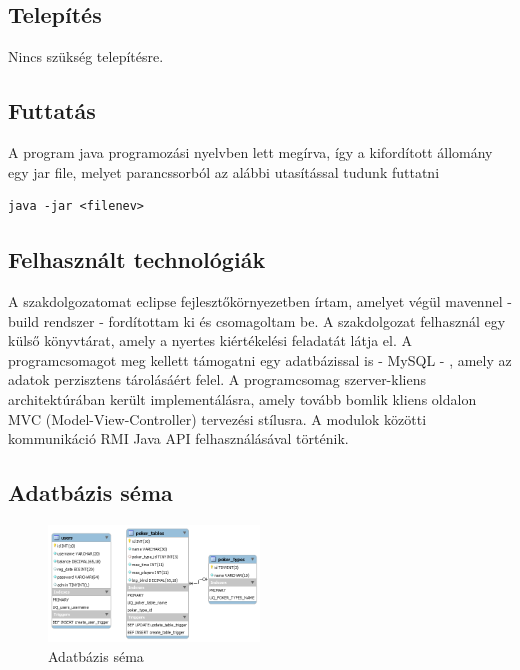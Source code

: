 \subsection{Telepítés}
Nincs szükség telepítésre.
\subsection{Futtatás}
A program java programozási nyelvben lett megírva, így a kifordított állomány egy jar file, melyet parancssorból az alábbi utasítással tudunk futtatni
\begin{lstlisting}
java -jar <filenev>
\end{lstlisting}
\subsection{Felhasznált technológiák}
A szakdolgozatomat eclipse fejlesztőkörnyezetben írtam, amelyet végül mavennel - build rendszer - fordítottam ki és csomagoltam be. A szakdolgozat felhasznál egy külső könyvtárat, amely a nyertes kiértékelési feladatát látja el. A programcsomagot meg kellett támogatni egy adatbázissal is - MySQL - , amely az adatok perzisztens tárolásáért felel. A programcsomag szerver-kliens architektúrában került implementálásra, amely tovább bomlik kliens oldalon MVC (Model-View-Controller) tervezési stílusra. A modulok közötti kommunikáció RMI Java API felhasználásával történik.
\subsection{Adatbázis séma}
\begin{figure}[h!]
  \caption{Adatbázis séma}
  \centering
    \includegraphics[width=0.5\textwidth]{user-documentation/images/db_scheme.png}
\end{figure}
